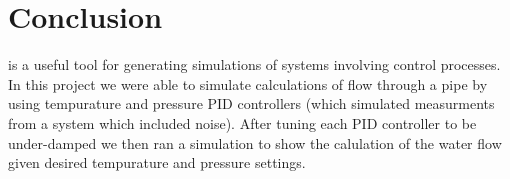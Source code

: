 \documentclass[main.tex]{subfile}
\begin{document}
\section{Conclusion} 
\label{sec:conclusion}

\Labview is a useful tool for generating simulations of systems involving
control processes. In this project we were able to simulate calculations of flow
through a pipe by using tempurature and pressure PID controllers (which
simulated measurments from a system which included noise). After tuning each PID
controller to be under-damped we then ran a simulation to show the calulation of
the water flow given desired tempurature and pressure settings.

\end{document}
